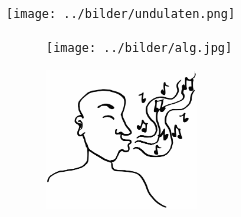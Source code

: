 \sclearpage

\sclearpage

\sclearpage

\begin{intersong}
\begin{center}
\texttt{[image: ../bilder/undulaten.png]} 
\end{center}
\end{intersong}
\sclearpage

\sclearpage

\sclearpage



\begin{figure}
\begin{center}
\texttt{[image: ../bilder/alg.jpg]} 
\end{center}
\end{figure}
\clearpage

\clearpage

\clearpage

\clearpage

\clearpage

\clearpage


\clearpage
\begin{figure}[b]
	\begin{center}
		\includegraphics[width=40mm]{../bilder/fardigabilder/BilderTillKapitel/visslaren.png} 
	\end{center}
\end{figure}
